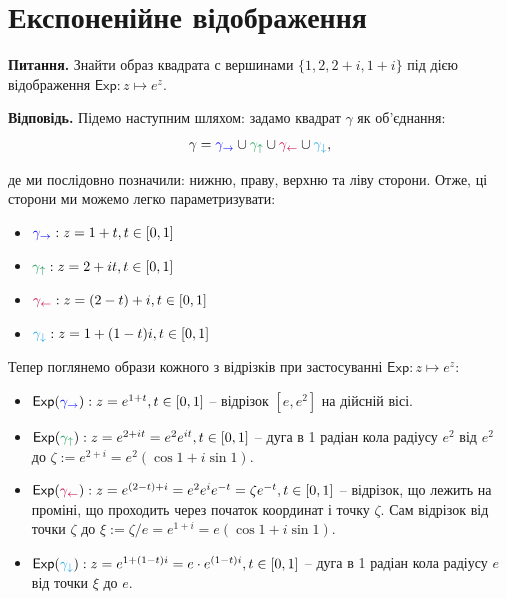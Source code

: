 \documentclass[14pt]{extarticle}
\newcommand{\<}{\langle}
\renewcommand{\>}{\rangle}
\theoremstyle{mystyle}{\newtheorem{definition}{Definition}[section]}
\theoremstyle{mystyle}{\newtheorem{proposition}[definition]{Proposition}}
\theoremstyle{mystyle}{\newtheorem{theorem}[definition]{Theorem}}
\theoremstyle{mystyle}{\newtheorem{lemma}[definition]{Lemma}}
\theoremstyle{mystyle}{\newtheorem{corollary}[definition]{Corollary}}
\theoremstyle{mystyle}{\newtheorem*{remark}{Remark}}
\theoremstyle{mystyle}{\newtheorem*{remarks}{Remarks}}
\theoremstyle{mystyle}{\newtheorem*{example}{Example}}
\theoremstyle{mystyle}{\newtheorem*{examples}{Examples}}
\theoremstyle{definition}{\newtheorem*{exercise}{Exercise}}
\theoremstyle{cstyle}{\newtheorem*{cthm}{}}
\theoremstyle{warn}
\begin{document}
\section{Експоненійне відображення}

\textbf{Питання.} Знайти образ квадрата с вершинами $\{1,2,2+i,1+i\}$ під дією відображення $\mathsf{Exp}: z \mapsto e^z$.

\textbf{Відповідь.} Підемо наступним шляхом: задамо квадрат $\gamma$ як об'єднання:
\begin{equation}
    \gamma = \textcolor{blue}{\gamma_{\rightarrow}} \cup \textcolor{ForestGreen}{\gamma_{\uparrow}} \cup \textcolor{purple}{\gamma_{\leftarrow}} \cup \textcolor{Cerulean}{\gamma_{\downarrow}},
\end{equation}

де ми послідовно позначили: нижню, праву, верхню та ліву сторони. Отже, ці сторони ми можемо легко параметризувати:
\begin{itemize}
    \item $\textcolor{blue}{\gamma_{\rightarrow}}: z = 1+t, t \in [0,1]$
    \item $\textcolor{ForestGreen}{\gamma_{\uparrow}}: z = 2+it, t \in [0,1]$
    \item $\textcolor{purple}{\gamma_{\leftarrow}}: z = (2-t)+i, t \in [0,1]$
    \item $\textcolor{Cerulean}{\gamma_{\downarrow}}: z = 1 + (1-t)i, t \in [0,1]$
\end{itemize}

Тепер поглянемо образи кожного з відрізків при застосуванні $\mathsf{Exp}: z \mapsto e^z$:
\begin{itemize}
    \item $\mathsf{Exp}(\textcolor{blue}{\gamma_{\rightarrow}}): z = e^{1+t}, t \in [0,1]$ -- відрізок $[e,e^2]$ на дійсній вісі.
    \item $\mathsf{Exp}(\textcolor{ForestGreen}{\gamma_{\uparrow}}): z = e^{2+it}=e^2e^{it}, t \in [0,1]$ -- дуга в 1 радіан кола радіусу $e^2$ від $e^2$ до $\zeta := e^{2+i}=e^2(\cos 1 + i\sin 1)$.
    \item $\mathsf{Exp}(\textcolor{purple}{\gamma_{\leftarrow}}): z = e^{(2-t)+i}=e^2e^ie^{-t}=\zeta e^{-t}, t \in [0,1]$ -- відрізок, що лежить на проміні, що проходить через початок координат і точку $\zeta$. Сам відрізок від точки $\zeta$ до $\xi := \zeta/e=e^{1+i}=e(\cos 1 + i \sin 1)$.
    \item $\mathsf{Exp}(\textcolor{Cerulean}{\gamma_{\downarrow}}): z = e^{1 + (1-t)i}=e \cdot e^{(1-t)i}, t \in [0,1]$ -- дуга в 1 радіан кола радіусу $e$ від точки $\xi$ до $e$.
\end{itemize}
\end{document}
